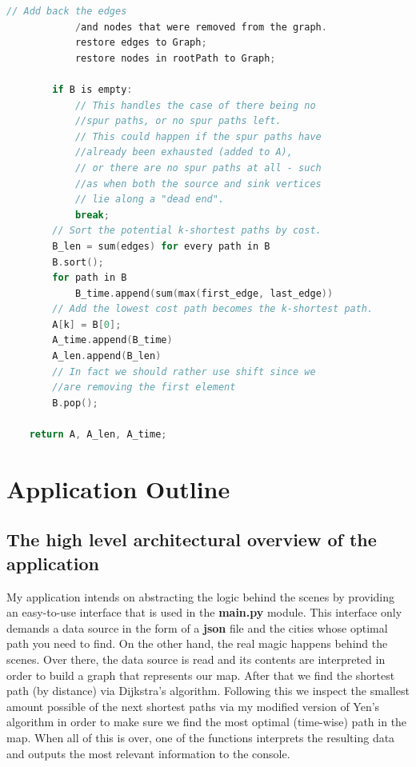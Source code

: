 \documentclass[12pt]{article}
\begin{document}
\begin{lstlisting}[language=C]
            // Add back the edges 
            /and nodes that were removed from the graph.
            restore edges to Graph;
            restore nodes in rootPath to Graph;
                    
        if B is empty:
            // This handles the case of there being no 
            //spur paths, or no spur paths left.
            // This could happen if the spur paths have 
            //already been exhausted (added to A), 
            // or there are no spur paths at all - such 
            //as when both the source and sink vertices 
            // lie along a "dead end".
            break;
        // Sort the potential k-shortest paths by cost.
        B_len = sum(edges) for every path in B
        B.sort();
        for path in B
            B_time.append(sum(max(first_edge, last_edge))
        // Add the lowest cost path becomes the k-shortest path.
        A[k] = B[0];
        A_time.append(B_time)
        A_len.append(B_len)
        // In fact we should rather use shift since we 
        //are removing the first element
        B.pop();
    
    return A, A_len, A_time;

\end{lstlisting}

\section{Application Outline}\label{sec_ps}
\subsection{The high level architectural overview of the application}
My application intends on abstracting the logic behind the scenes by providing an easy-to-use interface that is used in the \textbf{main.py} module. This interface only demands a data source in the form of a \textbf{json} file and the cities whose optimal path you need to find.
\newline\newline
On the other hand, the real magic happens behind the scenes. Over there, the data source is read and its contents are interpreted in order to build a graph that represents our map. After that we find the shortest path (by distance) via Dijkstra's algorithm. Following this we inspect the smallest amount possible of the next shortest paths via my modified version of Yen's algorithm in order to make sure we find the most optimal (time-wise) path in the map. When all of this is over, one of the functions interprets the resulting data and outputs the most relevant information to the console.
\end{document}
